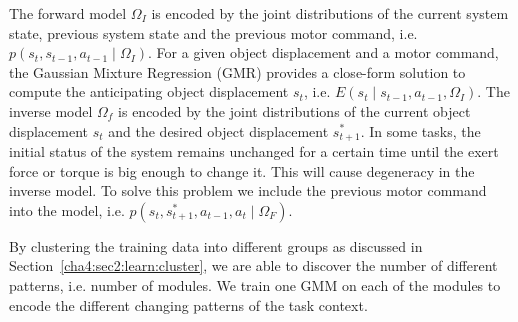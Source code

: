 
The forward model $\Omega_I$ is encoded by the joint distributions of the current system state, previous system state and the previous motor command, i.e. $p(s_t,s_{t-1},a_{t-1}\mid{\Omega_I})$. For a given object displacement and a motor command, the Gaussian Mixture Regression (GMR) provides a close-form solution to compute the anticipating object displacement $s_t$, i.e. $E(s_t{\mid}s_{t-1},a_{t-1},{\Omega_I})$. The inverse model $\Omega_f$ is encoded by the joint distributions of the current object displacement $s_t$ and the desired object displacement $s^{*}_{t+1}$. In some tasks, the initial status of the system remains unchanged for a certain time until the exert force or torque is big enough to change it. This will cause degeneracy in the inverse model. To solve this problem we include the previous motor command into the model, i.e. $p(s_t,s^{*}_{t+1},a_{t-1},a_t{\mid}{\Omega_F})$.



By clustering the training data into different groups as discussed in Section~\ref{cha4:sec2:learn:cluster}, we are able to discover the number of different patterns, i.e. number of modules. We train one GMM on each of the modules to encode the different changing patterns of the task context.


